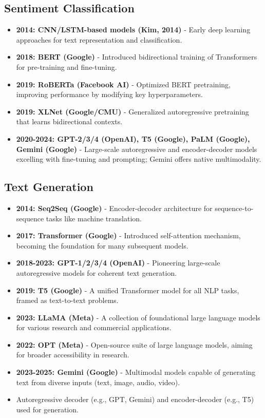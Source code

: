 \documentclass{article}
\begin{document}
\subsection{Sentiment Classification}
\begin{itemize}[leftmargin=1.5em]
 \item \textbf{2014: CNN/LSTM-based models (Kim, 2014)} - Early deep learning approaches for text representation and classification.
 \item \textbf{2018: BERT (Google)} - Introduced bidirectional training of Transformers for pre-training and fine-tuning.
 \item \textbf{2019: RoBERTa (Facebook AI)} - Optimized BERT pretraining, improving performance by modifying key hyperparameters.
 \item \textbf{2019: XLNet (Google/CMU)} - Generalized autoregressive pretraining that learns bidirectional contexts.
 \item \textbf{2020-2024: GPT-2/3/4 (OpenAI), T5 (Google), PaLM (Google), Gemini (Google)} - Large-scale autoregressive and encoder-decoder models excelling with fine-tuning and prompting; Gemini offers native multimodality.
\end{itemize}

\subsection{Text Generation}
\begin{itemize}[leftmargin=1.5em]
 \item \textbf{2014: Seq2Seq (Google)} - Encoder-decoder architecture for sequence-to-sequence tasks like machine translation.
 \item \textbf{2017: Transformer (Google)} - Introduced self-attention mechanism, becoming the foundation for many subsequent models.
 \item \textbf{2018-2023: GPT-1/2/3/4 (OpenAI)} - Pioneering large-scale autoregressive models for coherent text generation.
 \item \textbf{2019: T5 (Google)} - A unified Transformer model for all NLP tasks, framed as text-to-text problems.
 \item \textbf{2023: LLaMA (Meta)} - A collection of foundational large language models for various research and commercial applications.
 \item \textbf{2022: OPT (Meta)} - Open-source suite of large language models, aiming for broader accessibility in research.
 \item \textbf{2023-2025: Gemini (Google)} - Multimodal models capable of generating text from diverse inputs (text, image, audio, video).
 \item Autoregressive decoder (e.g., GPT, Gemini) and encoder-decoder (e.g., T5) used for generation.
\end{itemize}
\end{document}

